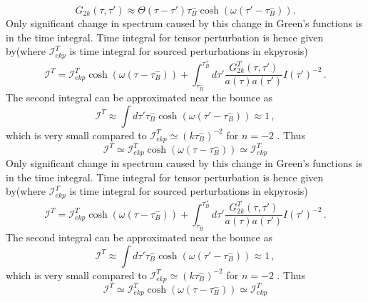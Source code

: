 \documentclass[12pt,a4paper]{article}
\numberwithin{equation}{section}
\numberwithin{equation}{section}
\begin{document}
\begin{equation}
     G_{2k}(\tau,\tau') \approx \Theta(\tau-\tau')  \tau_B^-  \cosh(\omega(\tau'-\tau_B^-)).
     \label{eq:green 2}
\end{equation}
Only significant change in spectrum caused by this change in Green's functions is in the time integral. 
Time integral for tensor perturbation is hence given by(where $\mathcal{I}^T_{ekp}$ is time integral for sourced perturbations in ekpyrosis)
\begin{equation}
\mathcal{I}^T = \mathcal{I}^T_{ekp} \cosh(\omega(\tau-\tau_B^-)) + \int^{\tau_B^+}_{\tau_B^-} d\tau' \frac{G^T_{2k}(\tau,\tau')}{a(\tau)a(\tau')} I(\tau')^{-2} \, .
\label{eq:timei}
\end{equation}
The second integral can be approximated near the bounce as 
\begin{equation}
\mathcal{I}^T \approx \int d\tau'   \tau_B^-  \cosh(\omega(\tau'-\tau_B^-))  \approx 1 \, ,
\label{eq:timei}
\end{equation}
which is very small compared to $\mathcal{I}^T_{ekp}\simeq (k\tau_{B}^-)^{-2}$ for $n=-2$ \cite{r1}.
Thus
\begin{equation}
\mathcal{I}^T \simeq \mathcal{I}^T_{ekp} \cosh(\omega(\tau-\tau_B^-)) \simeq \mathcal{I}^T_{ekp}
\label{eq:timei}
\end{equation}
Only significant change in spectrum caused by this change in Green's functions is in the time integral. 
Time integral for tensor perturbation is hence given by(where $\mathcal{I}^T_{ekp}$ is time integral for sourced perturbations in ekpyrosis)
\begin{equation}
\mathcal{I}^T = \mathcal{I}^T_{ekp} \cosh(\omega(\tau-\tau_B^-)) + \int^{\tau_B^+}_{\tau_B^-} d\tau' \frac{G^T_{2k}(\tau,\tau')}{a(\tau)a(\tau')} I(\tau')^{-2} \, .
\label{eq:timei}
\end{equation}
The second integral can be approximated near the bounce as 
\begin{equation}
\mathcal{I}^T \approx \int d\tau'   \tau_B^-  \cosh(\omega(\tau'-\tau_B^-))  \approx 1 \, ,
\label{eq:timei}
\end{equation}
which is very small compared to $\mathcal{I}^T_{ekp}\simeq (k\tau_{B}^-)^{-2}$ for $n=-2$ \cite{r1}.
Thus
\begin{equation}
\mathcal{I}^T \simeq \mathcal{I}^T_{ekp} \cosh(\omega(\tau-\tau_B^-)) \simeq \mathcal{I}^T_{ekp}
\label{eq:timei}
\end{equation}
\end{document}
